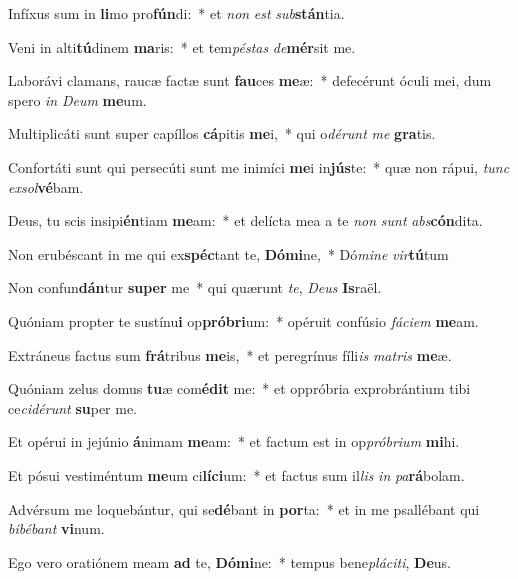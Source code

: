 \item Infíxus sum in \textbf{li}mo pro\textbf{fún}di:~* et \textit{non} \textit{est} \textit{sub}\textbf{stán}tia.
\item Veni in alti\textbf{tú}dinem \textbf{ma}ris:~* et tem\textit{pés}\textit{tas} \textit{de}\textbf{mér}sit me.
\item Laborávi clamans, raucæ factæ sunt \textbf{fau}ces \textbf{me}æ:~* defecérunt óculi mei, dum spero \textit{in} \textit{De}\textit{um} \textbf{me}um.
\item Multiplicáti sunt super capíllos \textbf{cá}pitis \textbf{me}i,~* qui o\textit{dé}\textit{runt} \textit{me} \textbf{gra}tis.
\item Confortáti sunt qui persecúti sunt me inimíci \textbf{me}i in\textbf{jús}te:~* quæ non rápui, \textit{tunc} \textit{ex}\textit{sol}\textbf{vé}bam.
\item Deus, tu scis insipi\textbf{én}tiam \textbf{me}am:~* et delícta mea a te \textit{non} \textit{sunt} \textit{abs}\textbf{cón}dita.
\item Non erubéscant in me qui ex\textbf{spéc}tant te, \textbf{Dó}\textbf{mi}ne,~* Dó\textit{mi}\textit{ne} \textit{vir}\textbf{tú}tum
\item Non confun\textbf{dán}tur \textbf{su}\textbf{per} me~* qui quærunt \textit{te}, \textit{De}\textit{us} \textbf{Is}raël.
\item Quóniam propter te sustínu\textbf{i} op\textbf{pró}\textbf{bri}um:~* opéruit confúsio \textit{fá}\textit{ci}\textit{em} \textbf{me}am.
\item Extráneus factus sum \textbf{frá}tribus \textbf{me}is,~* et peregrínus fíli\textit{is} \textit{ma}\textit{tris} \textbf{me}æ.
\item Quóniam zelus domus \textbf{tu}æ com\textbf{é}\textbf{dit} me:~* et oppróbria exprobrántium tibi ce\textit{ci}\textit{dé}\textit{runt} \textbf{su}per me.
\item Et opérui in jejúnio \textbf{á}nimam \textbf{me}am:~* et factum est in op\textit{pró}\textit{bri}\textit{um} \textbf{mi}hi.
\item Et pósui vestiméntum \textbf{me}um ci\textbf{lí}\textbf{ci}um:~* et factus sum il\textit{lis} \textit{in} \textit{pa}\textbf{rá}bolam.
\item Advérsum me loquebántur, qui se\textbf{dé}bant in \textbf{por}ta:~* et in me psallébant qui \textit{bi}\textit{bé}\textit{bant} \textbf{vi}num.
\item Ego vero oratiónem meam \textbf{ad} te, \textbf{Dó}\textbf{mi}ne:~* tempus bene\textit{plá}\textit{ci}\textit{ti}, \textbf{De}us.
